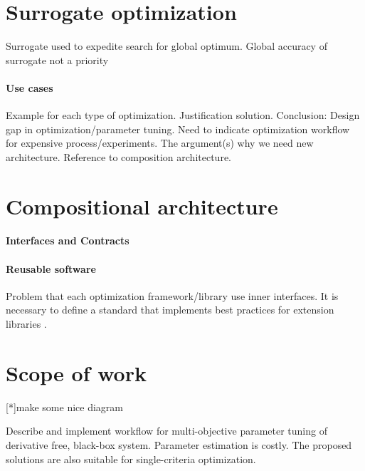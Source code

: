     \section{Surrogate optimization}
    Surrogate used to expedite search for global optimum. Global accuracy of surrogate
    not a priority

        \paragraph{Use cases}
        Example for each type of optimization. Justification solution.
        Conclusion: Design gap in optimization/parameter tuning. 
        Need to indicate optimization workflow for expensive process/experiments. 
        The argument(s) why we need new architecture. Reference to composition architecture.

    \section{Compositional architecture}
        \paragraph{Interfaces and Contracts}

        \paragraph{Reusable software}
        Problem that each optimization framework/library use inner interfaces. 
        It is necessary to define a standard that implements best practices for extension libraries \cite{buitinck2013api}.

    \section{Scope of work}
        [*]make some nice diagram

        Describe and implement workflow for multi-objective parameter tuning of derivative free, black-box system. Parameter estimation is costly.
        The proposed solutions are also suitable for single-criteria optimization.

